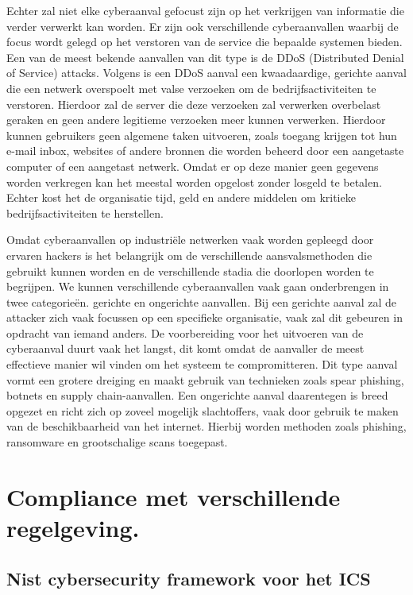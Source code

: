 Echter zal niet elke cyberaanval gefocust zijn op het verkrijgen van informatie die verder verwerkt kan worden. Er zijn ook verschillende cyberaanvallen waarbij de focus wordt gelegd op het verstoren van de service die bepaalde systemen bieden. Een van de meest bekende aanvallen van dit type is de DDoS (Distributed Denial of Service) attacks. Volgens \textcite{Baker2024} is een DDoS aanval een kwaadaardige, gerichte aanval die een netwerk overspoelt met valse verzoeken om de bedrijfsactiviteiten te verstoren. Hierdoor zal de server die deze verzoeken zal verwerken overbelast geraken en geen andere legitieme verzoeken meer kunnen verwerken. Hierdoor kunnen gebruikers geen algemene taken uitvoeren, zoals toegang krijgen tot hun e-mail inbox, websites of andere bronnen die worden beheerd door een aangetaste computer of een aangetast netwerk. Omdat er op deze manier geen gegevens worden verkregen kan het meestal worden opgelost zonder losgeld te betalen. Echter kost het de organisatie tijd, geld en andere middelen om kritieke bedrijfsactiviteiten te herstellen.

Omdat cyberaanvallen op industriële netwerken vaak worden gepleegd door ervaren hackers is het belangrijk om de verschillende aansvalsmethoden die gebruikt kunnen worden en de verschillende stadia die doorlopen worden te begrijpen. We kunnen verschillende cyberaanvallen vaak gaan onderbrengen in twee categorieën. gerichte en ongerichte aanvallen. Bij een gerichte aanval zal de attacker zich vaak focussen op een specifieke organisatie, vaak zal dit gebeuren in opdracht van iemand anders. De voorbereiding voor het uitvoeren van de cyberaanval duurt vaak het langst, dit komt omdat de aanvaller de meest effectieve manier wil vinden om het systeem te compromitteren. Dit type aanval vormt een grotere dreiging en maakt gebruik van technieken zoals spear phishing, botnets en supply chain-aanvallen. Een ongerichte aanval daarentegen is breed opgezet en richt zich op zoveel mogelijk slachtoffers, vaak door gebruik te maken van de beschikbaarheid van het internet. Hierbij worden methoden zoals phishing, ransomware en grootschalige scans toegepast. \autocite{biju2019}



\section{Compliance met verschillende regelgeving.}
\subsection{Nist cybersecurity framework voor het ICS}

